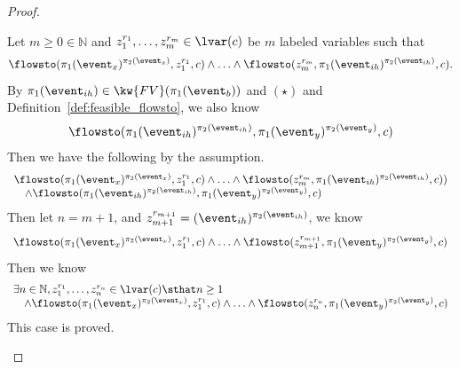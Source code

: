 \begin{proof}
\begin{case}
\[            \]
            Let $m \geq 0 \in \mathbb{N}$ and $z_1^{r_1}, \ldots, z_m^{r_m} \in \lvar(c) $ be 
            $m$ labeled variables such that
            \[
              \flowsto(\pi_1(\event_x)^{\pi_2(\event_x)},  z_1^{r_1}, c) 
            \land \ldots \land \flowsto(z_m^{r_m}, \pi_1(\event_{ih})^{\pi_2(\event_{ih})}, c).
            \]
            By $\pi_1(\event_{ih}) \in  \kw{FV}(\pi_1(\event_b)) $ and $(\star)$ and Definition~\ref{def:feasible_flowsto}, we also know
            \[
              \flowsto(\pi_1(\event_{ih})^{\pi_2(\event_{ih})}, \pi_1(\event_y)^{\pi_2(\event_y)}, c)
              \]
            Then we have the following by the assumption.
            \[
              \begin{array}{l}
              \flowsto(\pi_1(\event_x)^{\pi_2(\event_x)},  z_1^{r_1}, c) 
              \land \ldots \land \flowsto(z_m^{r_m}, \pi_1(\event_{ih})^{\pi_2(\event_{ih})}, c) )
               \\ \quad  
               \land  \flowsto(\pi_1(\event_{ih})^{\pi_2(\event_{ih})}, \pi_1(\event_y)^{\pi_2(\event_y)}, c) 
              \end{array}
              \]
              Then let $n = m + 1$,
              and $z_{m+1}^{r_{m+1}} = (\event_{ih})^{\pi_2(\event_{ih})}$, we know
              \[
                \begin{array}{l}
                \flowsto(\pi_1(\event_x)^{\pi_2(\event_x)},  z_1^{r_1}, c) 
                \land \ldots 
                 \land  \flowsto(z_{m+1}^{r_{m+1}}, \pi_1(\event_y)^{\pi_2(\event_y)}, c) 
                \end{array}
                \]            
                Then we know
                \[
                  \begin{array}{l}
                    \exists n \in \mathbb{N}, z_1^{r_1}, \ldots, z_n^{r_n} \in \lvar(c) \sthat  n \geq 1 
                    \\ \quad  
                    \land
                  \flowsto(\pi_1(\event_x)^{\pi_2(\event_x)},  z_1^{r_1}, c) 
                  \land \ldots 
                   \land  \flowsto(z_{n}^{r_{n}}, \pi_1(\event_y)^{\pi_2(\event_y)}, c) 
                  \end{array}
                  \]               
              This case is proved.

      \end{case}

\end{proof}
